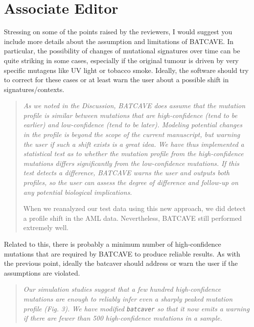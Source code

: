 \documentclass[11pt]{article}
\newenvironment{response}
{\begin{quote}\itshape}
{\end{quote}}
\begin{document}
\section*{Associate Editor}

Stressing on some of the points raised by the reviewers, I would suggest you include more details about the assumption and limitations of BATCAVE. In particular, the possibility of changes of mutational signatures over time can be quite striking in some cases, especially if the original tumour is driven by very specific mutagens like UV light or tobacco smoke. Ideally, the software should try to correct for these cases or at least warn the user about a possible shift in signatures/contexts.
\begin{response}
As we noted in the Discussion, BATCAVE does assume that the mutation profile is similar between mutations that are high-confidence (tend to be earlier) and low-confidence (tend to be later).
Modeling potential changes in the profile is beyond the scope of the current manuscript, but warning the user if such a shift exists is a great idea.
We have thus implemented a statistical test as to whether the mutation profile from the high-confidence mutations differs significantly from the low-confidence mutations.
If this test detects a difference, BATCAVE warns the user and outputs both profiles, so the user can assess the degree of difference and follow-up on any potential biological implications.

When we reanalyzed our test data using this new approach, we did detect a profile shift in the AML data.
Nevertheless, BATCAVE still performed extremely well.
\end{response}

Related to this, there is probably a minimum number of high-confidence mutations that are required by BATCAVE to produce reliable results. As with the previous point, ideally the batcaver should address or warn the user if the assumptions are violated.
\begin{response}
Our simulation studies suggest that a few hundred high-confidence mutations are enough to reliably infer even a sharply peaked mutation profile (Fig. 3).
We have modified \texttt{batcaver} so that it now emits a warning if there are fewer than 500 high-confidence mutations in a sample.
\end{response}
\end{document}
